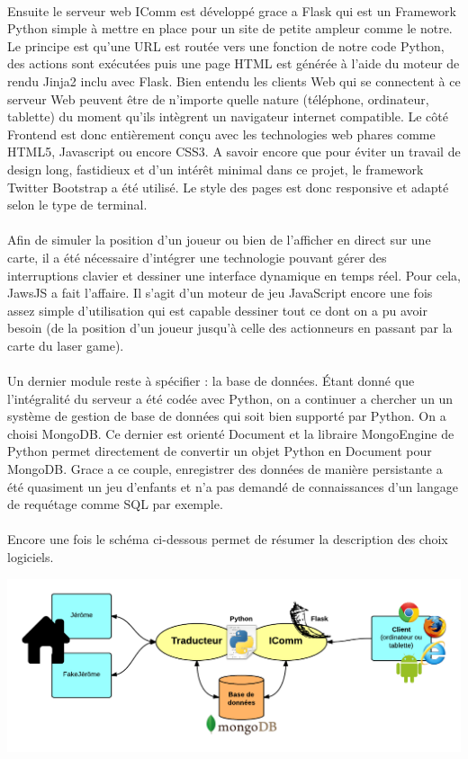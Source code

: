 \paragraph{}
Ensuite le serveur web IComm est développé grace a Flask qui est un Framework Python simple à mettre en place pour un site de petite ampleur comme le notre. Le principe est qu'une URL est routée vers une fonction de notre code Python, des actions sont exécutées puis une page HTML est générée à l'aide du moteur de rendu Jinja2 inclu avec Flask. Bien entendu les clients Web qui se connectent à ce serveur Web peuvent être de n'importe quelle nature (téléphone, ordinateur, tablette) du moment qu'ils intègrent un navigateur internet compatible. Le côté Frontend est donc entièrement conçu avec les technologies web phares comme HTML5, Javascript ou encore CSS3. A savoir encore que pour éviter un travail de design long, fastidieux et d'un intérêt minimal dans ce projet, le framework Twitter Bootstrap a été utilisé. Le style des pages est donc responsive et adapté selon le type de terminal.

\paragraph{}
Afin de simuler la position d'un joueur ou bien de l'afficher en direct sur une carte, il a été nécessaire d'intégrer une technologie pouvant gérer des interruptions clavier et dessiner une interface dynamique en temps réel. Pour cela, JawsJS a fait l'affaire. Il s'agit d'un moteur de jeu JavaScript encore une fois assez simple d'utilisation qui est capable dessiner tout ce dont on a pu avoir besoin (de la position d'un joueur jusqu'à celle des actionneurs en passant par la carte du laser game).

\paragraph{}
Un dernier module reste à spécifier : la base de données. Étant donné que l'intégralité du serveur a été codée avec Python, on a continuer a chercher un un système de gestion de base de données qui soit bien supporté par Python. On a choisi MongoDB. Ce dernier est orienté Document et la libraire MongoEngine de Python permet directement de convertir un objet Python en Document pour MongoDB. Grace a ce couple, enregistrer des données de manière persistante a été quasiment un jeu d'enfants et n'a pas demandé de connaissances d'un langage de requétage comme SQL par exemple.

\paragraph{}
Encore une fois le schéma ci-dessous permet de résumer la description des choix logiciels.

\includegraphics[scale=0.3]{image/architecture_logicielle}
